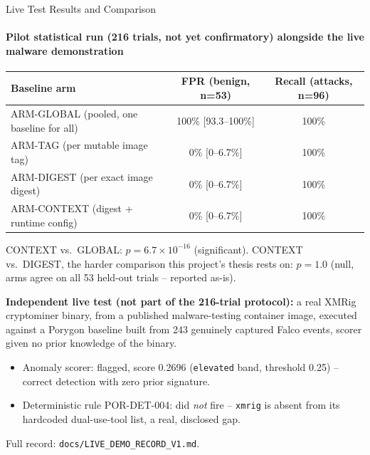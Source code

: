 \documentclass[aspectratio=169, 11pt]{beamer}
\begin{document}
\begin{frame}{Live Test Results and Comparison}
\framesubtitle{Pilot statistical run (216 trials, not yet confirmatory) alongside the live malware demonstration}
\scriptsize
\begin{table}
    \centering
    \scriptsize
    \renewcommand{\arraystretch}{1.1}
    \begin{tabular}{|l|c|c|}
        \hline
        \textbf{Baseline arm} & \textbf{FPR (benign, n=53)} & \textbf{Recall (attacks, n=96)} \\
        \hline
        ARM-GLOBAL (pooled, one baseline for all) & 100\% [93.3--100\%] & 100\% \\
        \hline
        ARM-TAG (per mutable image tag) & 0\% [0--6.7\%] & 100\% \\
        \hline
        ARM-DIGEST (per exact image digest) & 0\% [0--6.7\%] & 100\% \\
        \hline
        ARM-CONTEXT (digest + runtime config) & 0\% [0--6.7\%] & 100\% \\
        \hline
    \end{tabular}
\end{table}
\vspace{-2mm}
CONTEXT vs.\ GLOBAL: $p=6.7\times10^{-16}$ (significant). CONTEXT vs.\
DIGEST, the harder comparison this project's thesis rests on: $p=1.0$
(null, arms agree on all 53 held-out trials -- reported as-is).

\medskip
\textbf{Independent live test (not part of the 216-trial protocol):} a
real XMRig cryptominer binary, from a published malware-testing container
image, executed against a Porygon baseline built from 243 genuinely
captured Falco events, scorer given no prior knowledge of the binary.
\begin{itemize}
    \setlength{\itemsep}{1pt}
    \item Anomaly scorer: flagged, score 0.2696 (\texttt{elevated} band,
    threshold 0.25) -- correct detection with zero prior signature.
    \item Deterministic rule POR-DET-004: did \emph{not} fire --
    \texttt{xmrig} is absent from its hardcoded dual-use-tool list, a
    real, disclosed gap.
\end{itemize}
Full record: \texttt{docs/LIVE\_DEMO\_RECORD\_V1.md}.
\end{frame}
\end{document}

